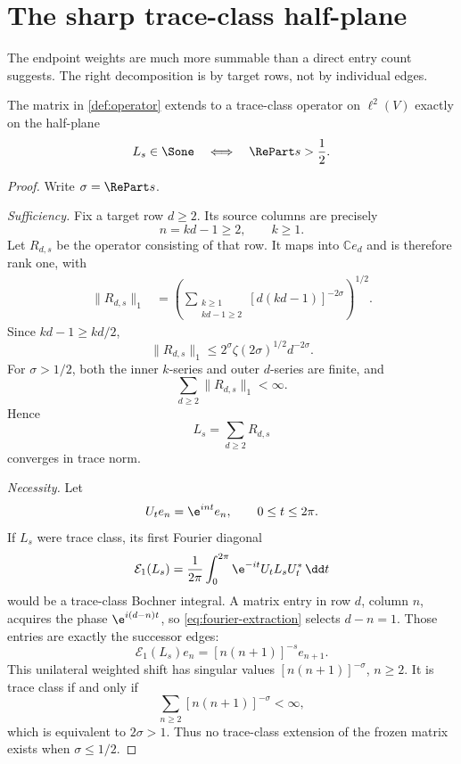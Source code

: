 \section{The sharp trace-class half-plane}
\label{sec:traceclass}

The endpoint weights are much more summable than a direct entry count
suggests.  The right decomposition is by target rows, not by individual
edges.

\begin{theorem}
\label{thm:traceclass}
The matrix in \cref{def:operator} extends to a trace-class operator on
\(\ell^2(V)\) exactly on the half-plane
\[
 L_s\in\Sone
 \quad\Longleftrightarrow\quad
 \RePart s>\frac12.
\]
\end{theorem}

\begin{proof}
Write \(\sigma=\RePart s\).

\emph{Sufficiency.}
Fix a target row \(d\ge2\).  Its source columns are precisely
\[
 n=kd-1\ge2,\qquad k\ge1.
\]
Let \(R_{d,s}\) be the operator consisting of that row.  It maps into
\(\mathbb Ce_d\) and is therefore rank one, with
\begin{align}
\|R_{d,s}\|_1
&=
\left(
 \sum_{\substack{k\ge1\\kd-1\ge2}}
 [d(kd-1)]^{-2\sigma}
\right)^{1/2}.                                      \label{eq:row-exact}
\end{align}
Since \(kd-1\ge kd/2\),
\begin{equation}
\label{eq:row-bound}
\|R_{d,s}\|_1
\le
2^\sigma\zeta(2\sigma)^{1/2}d^{-2\sigma}.
\end{equation}
For \(\sigma>1/2\), both the inner \(k\)-series and outer \(d\)-series are
finite, and
\[
\sum_{d\ge2}\|R_{d,s}\|_1<\infty.
\]
Hence
\[
 L_s=\sum_{d\ge2}R_{d,s}
\]
converges in trace norm.

\emph{Necessity.}
Let
\[
 U_te_n=\e^{int}e_n,\qquad 0\le t\le2\pi.
\]
If \(L_s\) were trace class, its first Fourier diagonal
\begin{equation}
\label{eq:fourier-extraction}
 \mathcal E_1(L_s)
 =
 \frac1{2\pi}\int_0^{2\pi}
 \e^{-it}U_tL_sU_t^*\,\dd t
\end{equation}
would be a trace-class Bochner integral.  A matrix entry in row \(d\), column
\(n\), acquires the phase \(\e^{i(d-n)t}\), so
\cref{eq:fourier-extraction} selects \(d-n=1\).  Those entries are exactly
the successor edges:
\[
 \mathcal E_1(L_s)e_n=[n(n+1)]^{-s}e_{n+1}.
\]
This unilateral weighted shift has singular values
\([n(n+1)]^{-\sigma}\), \(n\ge2\).  It is trace class if and only if
\[
 \sum_{n\ge2}[n(n+1)]^{-\sigma}<\infty,
\]
which is equivalent to \(2\sigma>1\).  Thus no trace-class extension of the
frozen matrix exists when \(\sigma\le1/2\).
\end{proof}

